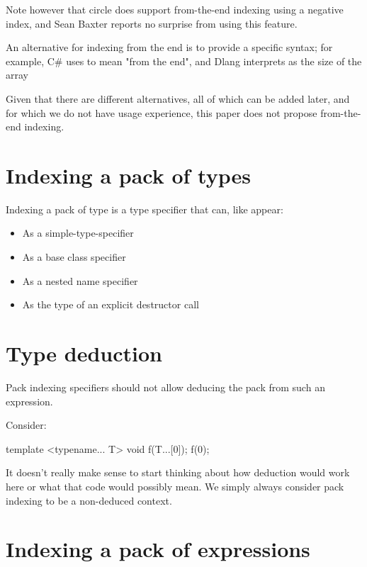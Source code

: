 \documentclass{wg21}
\begin{document}
Note however that circle does support from-the-end indexing using a negative index, and Sean Baxter reports no surprise from using this feature.

An alternative for indexing from the end is to provide a specific syntax; for example, C\# uses \tcode{\^{}} to mean "from the end", and Dlang interprets \tcode{\${}}
as the size of the array

Given that there are different alternatives, all of which can be added later, and for which we do not have usage experience, this paper does not propose
from-the-end indexing.

\section{Indexing a pack of types}

Indexing a pack of type is a type specifier that can, like  appear:
\begin{itemize}
    \item As a simple-type-specifier
    \item As a base class specifier
    \item As a nested name specifier
    \item As the type of an explicit destructor call
\end{itemize}

\section{Type deduction}

Pack indexing specifiers should not allow deducing the pack from such an expression.

Consider:

\begin{colorblock}
template <typename... T>
void f(T...[0]);
f(0);
\end{colorblock}

It doesn't really make sense to start thinking about how deduction would work here or what that code would possibly mean.
We simply always consider pack indexing to be a non-deduced context.

\section{Indexing a pack of expressions}
\end{document}
